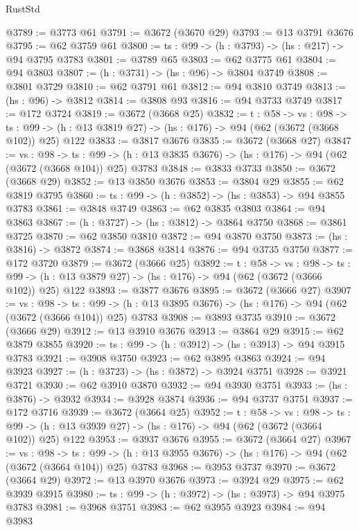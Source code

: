 \begin{lexlean}{RustStd}
\begin{coremodule}
{\begin{coremodule}
{{{{{{{{{@3789 := @3773 @61
@3791 := @3672 (@3670 @29)
@3793 := @13 @3791 @3676
@3795 := @62 @3759 @61
@3800 := {ts : @99} -> (h : @3793) -> (hs : @217) -> @94 @3795 @3783
@3801 := @3789 @65
@3803 := @62 @3775 @61
@3804 := @94 @3803
@3807 := (h : @3731) -> (hs : @96) -> @3804 @3749
@3808 := @3801 @3729
@3810 := @62 @3791 @61
@3812 := @94 @3810 @3749
@3813 := (hs : @96) -> @3812
@3814 := @3808 @93
@3816 := @94 @3733 @3749
@3817 := @172 @3724
@3819 := @3672 (@3668 @25)
@3832 := {t : @58} ->
  {vs : @98} ->
  {ts : @99} -> (h : @13 @3819 @27) -> (hs : @176) -> @94 (@62 (@3672 (@3668 @102)) @25) @122
@3833 := @3817 @3676
@3835 := @3672 (@3668 @27)
@3847 := {vs : @98} ->
  {ts : @99} -> (h : @13 @3835 @3676) -> (hs : @176) -> @94 (@62 (@3672 (@3668 @104)) @25) @3783
@3848 := @3833 @3733
@3850 := @3672 (@3668 @29)
@3852 := @13 @3850 @3676
@3853 := @3804 @29
@3855 := @62 @3819 @3795
@3860 := {ts : @99} -> (h : @3852) -> (hs : @3853) -> @94 @3855 @3783
@3861 := @3848 @3749
@3863 := @62 @3835 @3803
@3864 := @94 @3863
@3867 := (h : @3727) -> (hs : @3812) -> @3864 @3750
@3868 := @3861 @3725
@3870 := @62 @3850 @3810
@3872 := @94 @3870 @3750
@3873 := (hs : @3816) -> @3872
@3874 := @3868 @3814
@3876 := @94 @3735 @3750
@3877 := @172 @3720
@3879 := @3672 (@3666 @25)
@3892 := {t : @58} ->
  {vs : @98} ->
  {ts : @99} -> (h : @13 @3879 @27) -> (hs : @176) -> @94 (@62 (@3672 (@3666 @102)) @25) @122
@3893 := @3877 @3676
@3895 := @3672 (@3666 @27)
@3907 := {vs : @98} ->
  {ts : @99} -> (h : @13 @3895 @3676) -> (hs : @176) -> @94 (@62 (@3672 (@3666 @104)) @25) @3783
@3908 := @3893 @3735
@3910 := @3672 (@3666 @29)
@3912 := @13 @3910 @3676
@3913 := @3864 @29
@3915 := @62 @3879 @3855
@3920 := {ts : @99} -> (h : @3912) -> (hs : @3913) -> @94 @3915 @3783
@3921 := @3908 @3750
@3923 := @62 @3895 @3863
@3924 := @94 @3923
@3927 := (h : @3723) -> (hs : @3872) -> @3924 @3751
@3928 := @3921 @3721
@3930 := @62 @3910 @3870
@3932 := @94 @3930 @3751
@3933 := (hs : @3876) -> @3932
@3934 := @3928 @3874
@3936 := @94 @3737 @3751
@3937 := @172 @3716
@3939 := @3672 (@3664 @25)
@3952 := {t : @58} ->
  {vs : @98} ->
  {ts : @99} -> (h : @13 @3939 @27) -> (hs : @176) -> @94 (@62 (@3672 (@3664 @102)) @25) @122
@3953 := @3937 @3676
@3955 := @3672 (@3664 @27)
@3967 := {vs : @98} ->
  {ts : @99} -> (h : @13 @3955 @3676) -> (hs : @176) -> @94 (@62 (@3672 (@3664 @104)) @25) @3783
@3968 := @3953 @3737
@3970 := @3672 (@3664 @29)
@3972 := @13 @3970 @3676
@3973 := @3924 @29
@3975 := @62 @3939 @3915
@3980 := {ts : @99} -> (h : @3972) -> (hs : @3973) -> @94 @3975 @3783
@3981 := @3968 @3751
@3983 := @62 @3955 @3923
@3984 := @94 @3983
}}}}}}}}}
\end{coremodule}}
\end{coremodule}
\end{lexlean}
